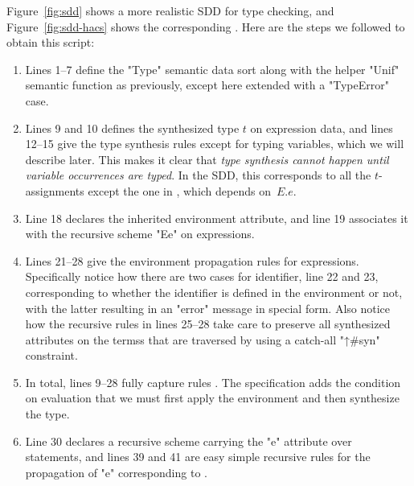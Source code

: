 \documentclass[11pt]{article} %
\begin{document}
\begin{example}
  Figure~\ref{fig:sdd} shows a more realistic SDD for type checking, and Figure~\ref{fig:sdd-hacs}
  shows the corresponding \HAX. Here are the steps we followed to obtain this script:
  \begin{enumerate}

  \item Lines 1--7 define the "Type" semantic data sort along with the helper "Unif" semantic
    function as previously, except here extended with a "TypeError" case.

  \item Lines 9 and 10 defines the synthesized type $t$ on expression data, and lines 12--15 give
    the type synthesis rules except for typing variables, which we will describe later. This makes
    it clear that \emph{type synthesis cannot happen until variable occurrences are typed}. In the
    SDD, this corresponds to all the $t$-assignments except the one in , which depends
    on~$E.e$.

  \item Line 18 declares the inherited environment attribute, and line 19 associates it with the
    recursive scheme "Ee" on expressions.

  \item Lines 21--28 give the environment propagation rules for expressions. Specifically notice how
    there are two cases for identifier, line 22 and 23, corresponding to whether the identifier is
    defined in the environment or not, with the latter resulting in an "error" message in special
    \HAX form. Also notice how the recursive rules in lines 25--28 take care to preserve all
    synthesized attributes on the termss that are traversed by using a catch-all "↑#syn" constraint.

  \item In total, lines 9--28 fully capture rules . The \HAX specification adds the
    condition on evaluation that we must first apply the environment and then synthesize the type.

  \item Line 30 declares a recursive scheme carrying the "e" attribute over statements, and lines 39
    and 41 are easy simple recursive rules for the propagation of "e" corresponding to
    .


\end{enumerate}
\end{example}
\end{document}
